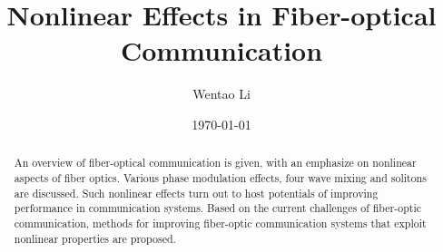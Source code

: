\documentclass[%
 reprint,
 amsmath,amssymb,
 aps,
]{revtex4-2}
\begin{document}

\title{Nonlinear Effects in Fiber-optical Communication}%

\author{Wentao Li}


\date{\today}%

\begin{abstract}
    An overview of fiber-optical communication 
    is given, with an emphasize on nonlinear aspects 
    of fiber optics. 
    Various phase modulation effects, 
    four wave mixing and 
    solitons are discussed. 
    Such nonlinear effects 
    turn out to host potentials of 
    improving performance in 
    communication systems. 
    Based on the current challenges of 
    fiber-optic communication, methods for 
    improving fiber-optic communication systems 
    that exploit nonlinear properties are proposed. 
\end{abstract}

\maketitle

\end{document}
